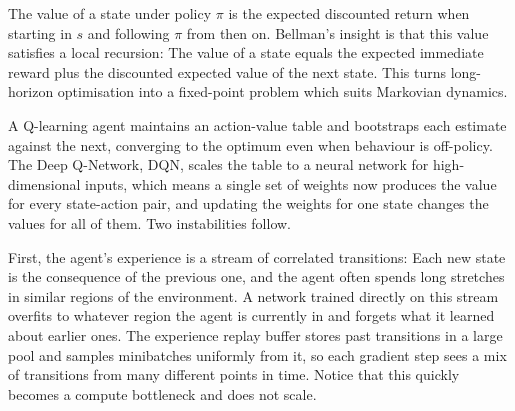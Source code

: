 
The value of a state under policy $\pi$ is the expected discounted return when starting in $s$ 
and following $\pi$ from then on.
Bellman's insight is that this value satisfies a local recursion:
The value of a state equals the expected immediate reward plus the discounted expected value of the next state.
This turns long-horizon optimisation into a fixed-point problem which suits Markovian dynamics.





A Q-learning agent maintains an action-value table and bootstraps each estimate against the next,
converging to the optimum even when behaviour is off-policy.
The Deep Q-Network, DQN, scales the table to a neural network for high-dimensional inputs,
which means a single set of weights now produces the value for every state-action pair,
and updating the weights for one state changes the values for all of them.
Two instabilities follow.

First, the agent's experience is a stream of correlated transitions:
Each new state is the consequence of the previous one,
and the agent often spends long stretches in similar regions of the environment.
A network trained directly on this stream overfits to whatever region the agent is currently in
and forgets what it learned about earlier ones.
The experience replay buffer stores past transitions in a large pool
and samples minibatches uniformly from it,
so each gradient step sees a mix of transitions from many different points in time. Notice 
that this quickly becomes a compute bottleneck and does not scale.

